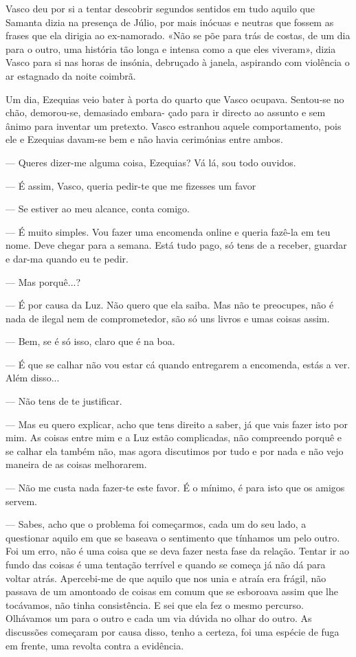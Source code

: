 Vasco deu por si a tentar descobrir segundos sentidos em tudo aquilo que
Samanta dizia na presença de Júlio, por mais inócuas e neutras que
fossem as frases que ela dirigia ao ex-namorado. «Não se põe para trás
de costas, de um dia para o outro, uma história tão longa e intensa como
a que eles viveram», dizia Vasco para si nas horas de insónia, debruçado
à janela, aspirando com violência o ar estagnado da noite coimbrã.

Um dia, Ezequias veio bater à porta do quarto que Vasco
ocupava. Sentou-se no chão, demorou-se, demasiado embara- çado para ir
directo ao assunto e sem ânimo para inventar um pretexto. Vasco
estranhou aquele comportamento, pois ele e Ezequias davam-se bem e não
havia cerimónias entre ambos.

--- Queres dizer-me alguma coisa, Ezequias? Vá lá, sou todo ouvidos.

--- É assim, Vasco, queria pedir-te que me fizesses um favor

--- Se estiver ao meu alcance, conta comigo.

--- É muito simples. Vou fazer uma encomenda online e
queria fazê-la em teu nome. Deve chegar para a semana. Está
tudo pago, só tens de a receber, guardar e dar-ma quando eu
te pedir.

--- Mas porquê...?

--- É por causa da Luz. Não quero que ela saiba. Mas não
te preocupes, não é nada de ilegal nem de comprometedor, são
só uns livros e umas coisas assim.

--- Bem, se é só isso, claro que é na boa.

--- É que se calhar não vou estar cá quando entregarem a
encomenda, estás a ver. Além disso...

--- Não tens de te justificar.

--- Mas eu quero explicar, acho que tens direito a saber, já
que vais fazer isto por mim. As coisas entre mim e a Luz estão
complicadas, não compreendo porquê e se calhar ela também
não, mas agora discutimos por tudo e por nada e não vejo
maneira de as coisas melhorarem.

--- Não me custa nada fazer-te este favor. É o mínimo, é
para isto que os amigos servem.

--- Sabes, acho que o problema foi começarmos, cada um
do seu lado, a questionar aquilo em que se baseava o sentimento
que tínhamos um pelo outro. Foi um erro, não é uma coisa que se
deva fazer nesta fase da relação. Tentar ir ao fundo das
coisas é uma tentação terrível e quando se começa já não dá para voltar
atrás. Apercebi-me de que aquilo que nos unia e atraía era frágil, não
passava de um amontoado de coisas em comum que se esboroava assim que
lhe tocávamos, não tinha consistência. E sei que ela fez o mesmo
percurso. Olhávamos um para o outro e cada um via dúvida no olhar do
outro. As discussões começaram por causa disso, tenho a certeza, foi uma
espécie de fuga em frente, uma revolta contra a evidência.

